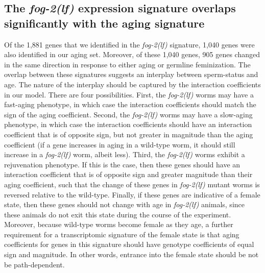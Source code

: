 \documentclass[9pt,twocolumn,twoside]{gsag3jnl}
\newcommand{\fog}{\emph{\mbox{fog-2(lf)}}}
\newcommand{\fogn}{1,881}
\newcommand{\coexpressed}{905}
\newcommand{\intersectn}{1,040}
\begin{document}
\subsection*{The \fog{} expression signature overlaps significantly with the aging
signature}
Of the \fogn{} genes that we identified in the \fog{}
signature, \intersectn{} genes were also identified in our aging set.
Moreover, of these \intersectn{}  genes, \coexpressed{} genes changed in the
same direction in response to either aging or germline feminization.
The overlap between these signatures suggests an interplay between sperm-status
and age. The nature of the interplay should be captured by the interaction coefficients
in our model.
There are four possibilities. First, the \fog{} worms may
have a fast-aging phenotype, in which case the interaction coefficients should
match the sign of the aging coefficient.
Second, the \fog{} worms may
have a slow-aging phenotype, in which case the interaction coefficients should
have an interaction coefficient that is of opposite sign, but not greater in
magnitude than the aging coefficient (if a gene increases in aging in a
wild-type worm, it should still increase in a \fog{} worm, albeit less).
Third, the \fog{} worms exhibit a rejuvenation phenotype. If this is the case,
then these genes should have an interaction coefficient that is of opposite sign
and greater magnitude than their aging coefficient, such that the change of
these genes in \fog{} mutant worms is reversed relative to the wild-type.
Finally, if these genes are indicative of a female state, then these genes
should not change with age in \fog{} animals, since these animals do not exit
this state during the course of the experiment.
Moreover, because wild-type
worms become female as they age, a further requirement for a transcriptomic
signature of the female state is that aging coefficients for genes in this
signature should have genotype coefficients of equal sign and magnitude. In
other words, entrance into the female state should be not be path-dependent.
\end{document}
